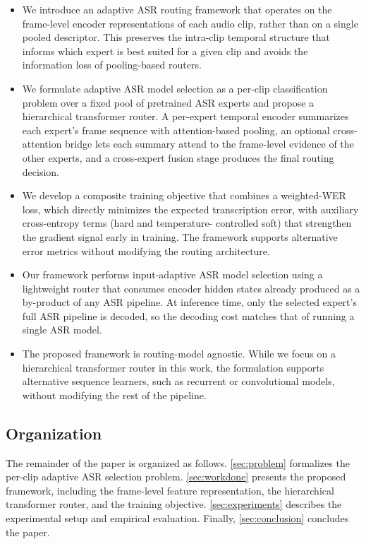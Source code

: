 \documentclass[journal]{IEEEtran}
\begin{document}
\begin{itemize}

\item We introduce an adaptive ASR routing framework that operates on
the frame-level encoder representations of each audio clip, rather
than on a single pooled descriptor. This preserves the intra-clip
temporal structure that informs which expert is best suited for a
given clip and avoids the information loss of pooling-based routers.

\item We formulate adaptive ASR model selection as a per-clip
classification problem over a fixed pool of pretrained ASR experts
and propose a hierarchical transformer router. A per-expert temporal
encoder summarizes each expert's frame sequence with attention-based
pooling, an optional cross-attention bridge lets each summary attend
to the frame-level evidence of the other experts, and a cross-expert
fusion stage produces the final routing decision.

\item We develop a composite training objective that combines a
weighted-WER loss, which directly minimizes the expected transcription
error, with auxiliary cross-entropy terms (hard and temperature-
controlled soft) that strengthen the gradient signal early in
training. The framework supports alternative error metrics without
modifying the routing architecture.

\item Our framework performs input-adaptive ASR model selection using
a lightweight router that consumes encoder hidden states already
produced as a by-product of any ASR pipeline. At inference time, only
the selected expert's full ASR pipeline is decoded, so the decoding
cost matches that of running a single ASR model.

\item The proposed framework is routing-model agnostic. While we
focus on a hierarchical transformer router in this work, the
formulation supports alternative sequence learners, such as recurrent
or convolutional models, without modifying the rest of the pipeline.

\end{itemize}


\subsection{Organization}

The remainder of the paper is organized as follows.
\cref{sec:problem} formalizes the per-clip adaptive ASR selection
problem. \cref{sec:workdone} presents the proposed framework,
including the frame-level feature representation, the hierarchical
transformer router, and the training objective.
\cref{sec:experiments} describes the experimental setup and empirical
evaluation. Finally, \cref{sec:conclusion} concludes the paper.
\end{document}
